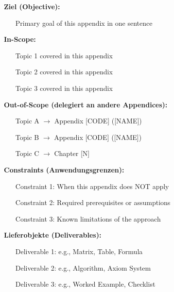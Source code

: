\begin{tcolorbox}[
    colback=orange!5!white,
    colframe=orange!75!black,
    title={\textbf{Appendix Scope: Ziel / In-Scope / Out-of-Scope / Constraints}},
    fonttitle=\bfseries
]

\textbf{Ziel (Objective):}
\begin{itemize}[nosep]
    \item [Primary goal of this appendix in one sentence]
\end{itemize}

\textbf{In-Scope:}
\begin{itemize}[nosep]
    \item [Topic 1 covered in this appendix]
    \item [Topic 2 covered in this appendix]
    \item [Topic 3 covered in this appendix]
\end{itemize}

\textbf{Out-of-Scope (delegiert an andere Appendices):}
\begin{itemize}[nosep]
    \item [Topic A] $\rightarrow$ Appendix [CODE] ([NAME])
    \item [Topic B] $\rightarrow$ Appendix [CODE] ([NAME])
    \item [Topic C] $\rightarrow$ Chapter [N]
\end{itemize}

\textbf{Constraints (Anwendungsgrenzen):}
\begin{itemize}[nosep]
    \item [Constraint 1: When this appendix does NOT apply]
    \item [Constraint 2: Required prerequisites or assumptions]
    \item [Constraint 3: Known limitations of the approach]
\end{itemize}

\textbf{Lieferobjekte (Deliverables):}
\begin{itemize}[nosep]
    \item [Deliverable 1: e.g., Matrix, Table, Formula]
    \item [Deliverable 2: e.g., Algorithm, Axiom System]
    \item [Deliverable 3: e.g., Worked Example, Checklist]
\end{itemize}

\end{tcolorbox}


%
%

